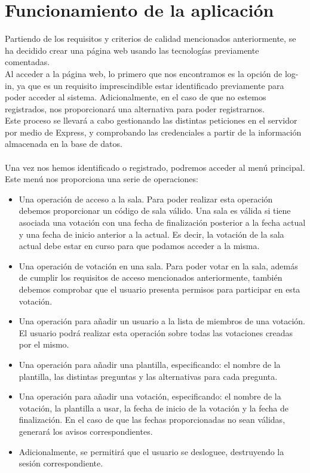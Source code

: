 \documentclass{article}
\begin{document}
 	\section{Funcionamiento de la aplicación}
 	Partiendo de los requisitos y criterios de calidad mencionados anteriormente, se ha decidido crear una página web usando las tecnologías previamente comentadas. \\
 	Al acceder a la página web, lo primero que nos encontramos es la opción de log-in, ya que es un requisito imprescindible estar identificado previamente para poder acceder al sistema. Adicionalmente, en el caso de que no estemos registrados, nos proporcionará una alternativa para poder registrarnos. \\
 	Este proceso se llevará a cabo gestionando las distintas peticiones en el servidor por medio de Express, y comprobando las credenciales a partir de la información almacenada en la base de datos. \\ ~\\
 	
 	Una vez nos hemos identificado o registrado, podremos acceder al menú principal. Este menú nos proporciona una serie de operaciones:
 	\begin{itemize}
 		\item Una operación de acceso a la sala. Para poder realizar esta operación debemos proporcionar un código de sala válido. Una sala es válida si tiene asociada una votación con una fecha de finalización posterior a la fecha actual y una fecha de inicio anterior a la actual. Es decir, la votación de la sala actual debe estar en curso para que podamos acceder a la misma.
 		
 		\item Una operación de votación en una sala. Para poder votar en la sala, además de cumplir los requisitos de acceso mencionados anteriormente, también debemos comprobar que el usuario presenta permisos para participar en esta votación.
 		
 		\item Una operación para añadir un usuario a la lista de miembros de una votación. El usuario podrá realizar esta operación sobre todas las votaciones creadas por el mismo.
 		
 		\item Una operación para añadir una plantilla, especificando: el nombre de la plantilla, las distintas preguntas y las alternativas para cada pregunta.
 		
 		\item Una operación para añadir una votación, especificando: el nombre de la votación, la plantilla a usar, la fecha de inicio de la votación y la fecha de finalización. En el caso de que las fechas proporcionadas no sean válidas, generará los avisos correspondientes.
 		
 		\item Adicionalmente, se permitirá que el usuario se desloguee, destruyendo la sesión correspondiente.
 	\end{itemize}
 
\end{document}
